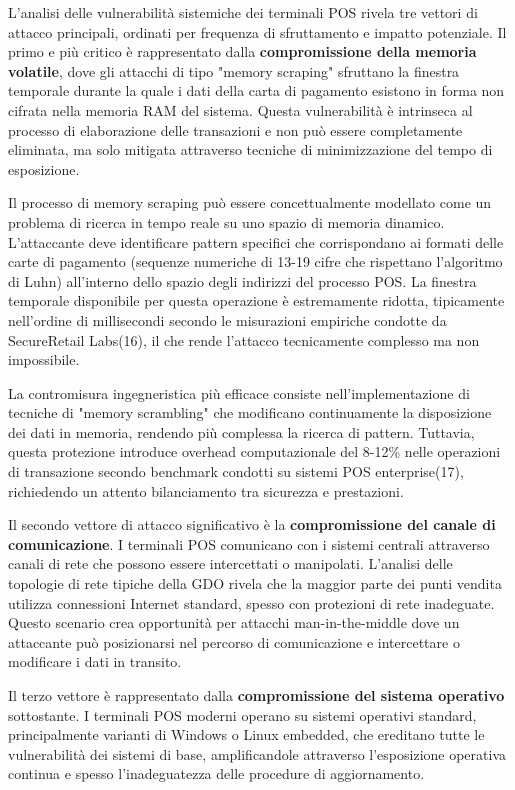 \documentclass[12pt,a4paper,oneside]{book}
\begin{document}
L'analisi delle vulnerabilità sistemiche dei terminali POS rivela tre vettori di attacco principali, ordinati per frequenza di sfruttamento e impatto potenziale. Il primo e più critico è rappresentato dalla \textbf{compromissione della memoria volatile}, dove gli attacchi di tipo "memory scraping" sfruttano la finestra temporale durante la quale i dati della carta di pagamento esistono in forma non cifrata nella memoria RAM del sistema. Questa vulnerabilità è intrinseca al processo di elaborazione delle transazioni e non può essere completamente eliminata, ma solo mitigata attraverso tecniche di minimizzazione del tempo di esposizione.

Il processo di memory scraping può essere concettualmente modellato come un problema di ricerca in tempo reale su uno spazio di memoria dinamico. L'attaccante deve identificare pattern specifici che corrispondano ai formati delle carte di pagamento (sequenze numeriche di 13-19 cifre che rispettano l'algoritmo di Luhn) all'interno dello spazio degli indirizzi del processo POS. La finestra temporale disponibile per questa operazione è estremamente ridotta, tipicamente nell'ordine di millisecondi secondo le misurazioni empiriche condotte da SecureRetail Labs(16), il che rende l'attacco tecnicamente complesso ma non impossibile.

La contromisura ingegneristica più efficace consiste nell'implementazione di tecniche di "memory scrambling" che modificano continuamente la disposizione dei dati in memoria, rendendo più complessa la ricerca di pattern. Tuttavia, questa protezione introduce overhead computazionale del 8-12\% nelle operazioni di transazione secondo benchmark condotti su sistemi POS enterprise(17), richiedendo un attento bilanciamento tra sicurezza e prestazioni.

Il secondo vettore di attacco significativo è la \textbf{compromissione del canale di comunicazione}. I terminali POS comunicano con i sistemi centrali attraverso canali di rete che possono essere intercettati o manipolati. L'analisi delle topologie di rete tipiche della GDO rivela che la maggior parte dei punti vendita utilizza connessioni Internet standard, spesso con protezioni di rete inadeguate. Questo scenario crea opportunità per attacchi man-in-the-middle dove un attaccante può posizionarsi nel percorso di comunicazione e intercettare o modificare i dati in transito.

Il terzo vettore è rappresentato dalla \textbf{compromissione del sistema operativo} sottostante. I terminali POS moderni operano su sistemi operativi standard, principalmente varianti di Windows o Linux embedded, che ereditano tutte le vulnerabilità dei sistemi di base, amplificandole attraverso l'esposizione operativa continua e spesso l'inadeguatezza delle procedure di aggiornamento.
\end{document}
